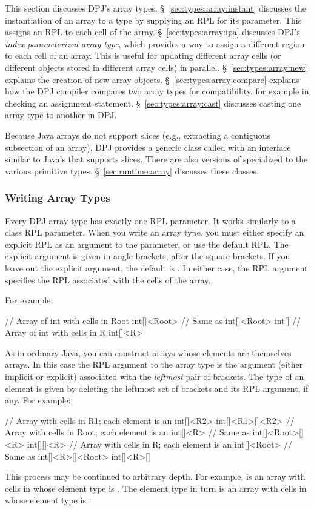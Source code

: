 This section discusses DPJ's array types.
\S~\ref{sec:types:array:instant} discusses the instantiation of an
array to a type by supplying an RPL for its parameter.  This assigns
an RPL to each cell of the array.  \S~\ref{sec:types:array:ipa}
discusses DPJ's \emph{index-parameterized array type}, which provides
a way to assign a different region to each cell of an array.  This is
useful for updating different array cells (or different objects stored
in different array cells) in parallel.  \S~\ref{sec:types:array:new}
explains the creation of new array objects.
\S~\ref{sec:types:array:compare} explains how the DPJ compiler
compares two array types for compatibility, for example in checking an
assignment statement.  \S~\ref{sec:types:array:cast} discusses casting
one array type to another in DPJ.

Because Java arrays do not support slices (e.g., extracting a
contiguous subsection of an array), DPJ provides a generic class
called  with an interface similar to Java's
 that supports slices.  There are also versions of
 specialized to the various primitive types.
\S~\ref{sec:runtime:array} discusses these classes.

\subsubsection{Writing Array Types%
\label{sec:types:array:instant}}

Every DPJ array type has exactly one RPL parameter.  It works
similarly to a class RPL parameter.  When you write an array type, you
must either specify an explicit RPL as an argument to the parameter,
or use the default RPL.  The explicit argument is given in angle
brackets, after the square brackets.  If you leave out the explicit
argument, the default is .  In either case, the RPL argument
specifies the RPL associated with the cells of the array.

For example:
%
\begin{dpjlisting}
// Array of int with cells in Root
int[]<Root>
// Same as int[]<Root>
int[]
// Array of int with cells in R
int[]<R>
\end{dpjlisting}

As in ordinary Java, you can construct arrays whose elements are
themselves arrays.  In this case the RPL argument to the array type is
the argument (either implicit or explicit) associated with the
\emph{leftmost} pair of brackets.  The type of an element is given by
deleting the leftmost set of brackets and its RPL argument, if any.
For example:
%
\begin{dpjlisting}
// Array with cells in R1; each element is an int[]<R2>
int[]<R1>[]<R2>
// Array with cells in Root; each element is an int[]<R>
// Same as int[]<Root>[]<R>
int[][]<R>
// Array with cells in R; each element is an int[]<Root>
// Same as int[]<R>[]<Root>
int[]<R>[]
\end{dpjlisting}
%
This process may be continued to arbitrary depth.  For example,
 is an array with cells in  whose
element type is .  The element type in turn is an
array with cells in  whose element type is .

